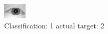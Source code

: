 \begin{figure}[h!]
\begin{center}
\includegraphics[width=0.60\columnwidth]{figures/ID881_class_1_target_2.png}
\end{center}
\caption{ Classification: 1 actual target: 2}
\label{fig:ID881_class_1_target_2}
\end{figure}
